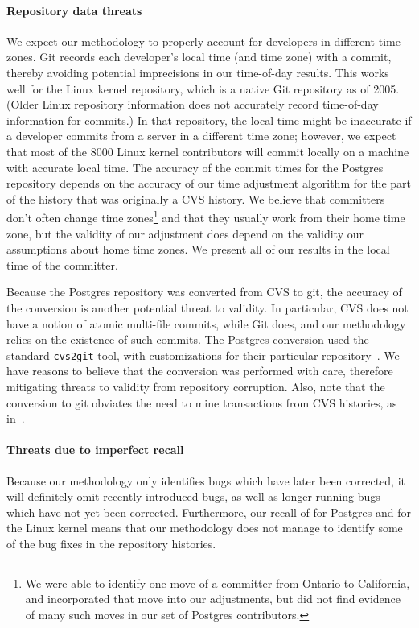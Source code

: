 \paragraph{Repository data threats}
We expect our methodology to properly account for developers in
different time zones. Git records each developer's local time (and
time zone) with a commit, thereby avoiding potential imprecisions in
our time-of-day results. This works well for the Linux kernel repository,
which is a native Git repository as of 2005. (Older Linux repository
information does not accurately record time-of-day information for
commits.) In that repository, the
local time might be inaccurate if a developer commits from a server in
a different time zone; however, we expect that most of the 8000 Linux kernel
contributors will commit locally on a machine with accurate local
time.  The accuracy of the commit times for the Postgres repository
depends on the accuracy of our time adjustment algorithm for the part
of the history that was originally a CVS history. We believe that
committers don't often change time zones\footnote{We were able to identify
one move of a committer from Ontario to California, and incorporated that
move into our adjustments, but did not find evidence of many such moves
in our set of Postgres contributors.} and that they usually work from their
home time zone, but the validity of our adjustment does depend on the
validity our assumptions about home time zones. We present all of our
results in the local time of the committer.

Because the Postgres repository was converted from CVS to git, the
accuracy of the conversion is another potential threat to validity.  In
particular, CVS does not have a notion of atomic multi-file commits,
while Git does, and our methodology relies on the existence of such
commits. The Postgres conversion used the standard {\tt cvs2git} tool,
with customizations for their particular
repository~\cite{haas09:_so_why_postg_using_git}. We have reasons to
believe that the conversion was performed with care, therefore
mitigating threats to validity from repository corruption. 
Also, note that the conversion to git obviates the need to mine transactions
from CVS histories, as in~\cite{zimmermann-msr-2004}.

\paragraph{Threats due to imperfect recall}
Because our methodology only identifies bugs which have later been
corrected, it will definitely omit recently-introduced bugs, as well
as longer-running bugs which have not yet been corrected. Furthermore,
our recall of \postR for Postgres and \linuxR for the Linux kernel means
that our methodology does not manage to identify some of the bug fixes
in the repository histories.

